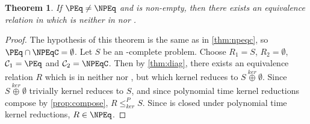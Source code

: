 \documentclass{article}
\newtheorem{theorem}{Theorem}[section]
\theoremstyle{definition} \newtheorem{definition}[definition]{Definition}
\newcommand{\kj}{\overset{ker}{\oplus}} %
\newcommand{\kr}{\leq^{P}_{ker}} %
\begin{document}
\begin{theorem}
  If $\PEq\neq\NPEq$ and \NPEqC is non-empty, then there exists an equivalence
  relation in \NPEq which is neither in \PEq nor \NPEqC.
\end{theorem}
\begin{proof}
  The hypothesis of this theorem is the same as in \autoref{thm:npeqc}, so
  $\PEq\cap\NPEqC=\emptyset$. Let $S$ be an \NPEq-complete problem. Choose
  $R_1=S$, $R_2=\emptyset$, $\mathcal{C}_1=\PEq$ and
  $\mathcal{C}_2=\NPEqC$. Then by \autoref{thm:diag}, there exists an
  equivalence relation $R$ which is in neither \NPEqC nor \PEq, but which
  kernel reduces to $S\kj\emptyset$. Since $S\kj\emptyset$ trivially kernel
  reduces to $S$, and since polynomial time kernel reductions compose by
  \autoref{prop:compose}, $R\kr S$. Since \NPEq is closed under polynomial time
  kernel reductions, $R\in\NPEq$.
\end{proof}

 
\end{document}
